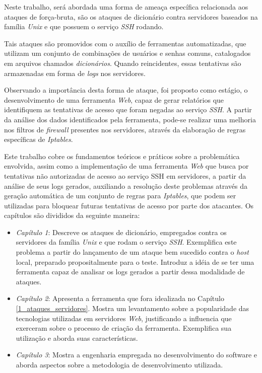 Neste trabalho, será abordada uma forma de ameaça específica relacionada aos ataques de força-bruta, são os ataques de dicionário contra servidores baseados na família \textit{Unix} e que possuem o serviço \textit{SSH} rodando.

Tais ataques são promovidos com o auxílio de ferramentas automatizadas, que utilizam um conjunto de combinações de usuários e senhas comuns, catalogados em arquivos chamados  \textit{dicionários}. Quando reincidentes, essas tentativas são armazenadas em forma de \textit{logs} nos servidores.

Observando a importância desta forma de ataque, foi proposto como estágio, o desenvolvimento de uma ferramenta \textit{Web}, capaz de gerar relatórios que identifiquem as tentativas de acesso que foram negadas ao serviço \textit{SSH}. A partir da análise dos dados identificados pela ferramenta, pode-se realizar uma melhoria nos filtros de \textit{firewall} presentes nos servidores, através da elaboração de regras específicas de \textit{Iptables}.

Este trabalho cobre os fundamentos teóricos e práticos sobre a problemática envolvida, assim como a implementação de uma ferramenta \textit{Web} que busca por tentativas não autorizadas de acesso ao serviço SSH em servidores, a partir da análise de seus logs gerados, auxiliando a resolução deste problemas através da geração automática de um conjunto de regras para \textit{Iptables}, que podem ser utilizadas para bloquear futuras tentativas de acesso por parte dos atacantes. Os capítulos são divididos da seguinte maneira:

\begin{itemize}
    \item \textit{Capítulo 1}: Descreve os ataques de dicionário, empregados contra os servidores da família \textit{Unix} e que rodam o serviço \textit{SSH}. Exemplifica este problema a partir do lançamento de um ataque bem sucedido contra o \textit{host} local, preparado propositalmente para o teste. Introduz a idéia de se ter uma ferramenta capaz de analisar os logs gerados a partir dessa modalidade de ataques.
    \item \textit{Capítulo 2}: Apresenta a ferramenta que fora idealizada no Capítulo \ref{1_ataques_servidores}. Mostra um levantamento sobre a popularidade das tecnologias utilizadas em servidores \textit{Web}, justificando a influencia que exerceram sobre o processo de criação da ferramenta. Exemplifica sua utilização e aborda suas características.
    \item \textit{Capítulo 3}: Mostra a engenharia empregada no desenvolvimento do software e aborda aspectos sobre a metodologia de desenvolvimento utilizada.
\end{itemize}

